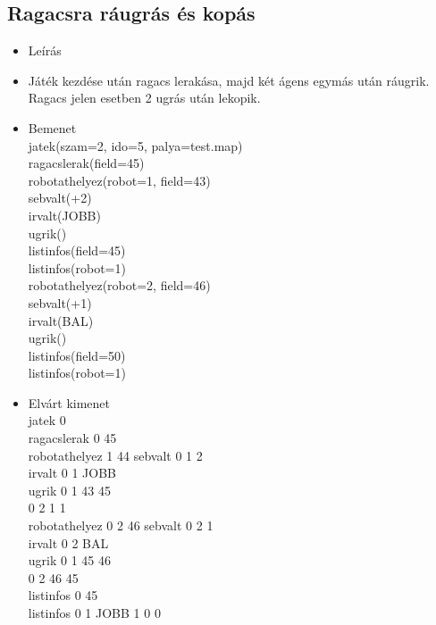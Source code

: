 \subsection{Ragacsra ráugrás és kopás}
\begin{itemize}
	\item Leírás\\
	\item Játék kezdése után ragacs lerakása, majd két ágens egymás után ráugrik. Ragacs jelen esetben 2 ugrás után lekopik.
	\item Bemenet\\
		jatek(szam=2, ido=5, palya=test.map) \\
		ragacslerak(field=45) \\
		robotathelyez(robot=1, field=43) \\
		sebvalt(+2) \\
		irvalt(JOBB) \\
		ugrik() \\
		listinfos(field=45) \\
		listinfos(robot=1) \\
		robotathelyez(robot=2, field=46) \\
		sebvalt(+1) \\
		irvalt(BAL) \\
		ugrik() \\
		listinfos(field=50) \\		
		listinfos(robot=1) \\		
	\item Elvárt kimenet\\
		jatek 0 \\
		ragacslerak 0 45 \\
		robotathelyez 1 44
		sebvalt 0 1 2 \\ 
		irvalt 0 1 JOBB \\  
		ugrik 0 1 43 45 \\ 
			  0 2 1 1 \\ 		
		robotathelyez 0 2 46
		sebvalt 0 2 1 \\ 
		irvalt 0 2 BAL \\  
		ugrik 0 1 45 46 \\ 
		      0 2 46 45 \\ 		
		listinfos 0 45 \\
		listinfos 0 1 JOBB 1 0 0 \\
\end{itemize}


